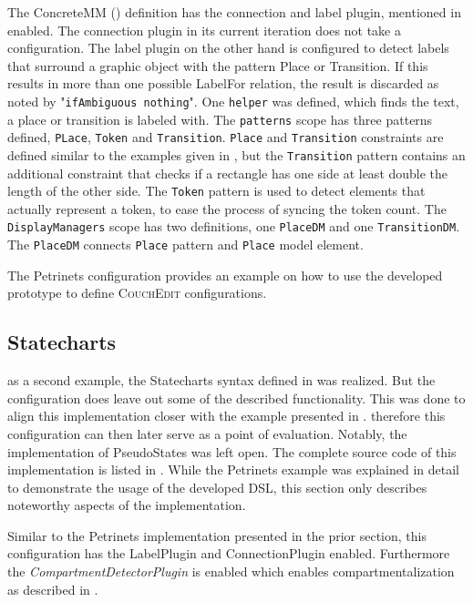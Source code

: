 The ConcreteMM () definition has the connection and label  plugin, mentioned in  enabled. The connection plugin in its current iteration does not take a configuration. The label plugin on the other hand is configured to detect labels that surround a graphic object with the pattern Place or Transition. If this results in more than one possible LabelFor relation, the result is discarded as noted by "\texttt{ifAmbiguous nothing}". One \texttt{helper} was defined, which finds the text, a place or transition is labeled with. The \texttt{patterns} scope has three patterns defined, \texttt{PLace}, \texttt{Token} and \texttt{Transition}. \texttt{Place} and \texttt{Transition} constraints are defined similar to the examples given in , but the \texttt{Transition} pattern contains an additional constraint that checks if a rectangle has one side at least double the length of the other side. The \texttt{Token} pattern is used to detect elements that actually represent a token, to ease the process of syncing the token count. The \texttt{DisplayManagers} scope has two definitions, one \texttt{PlaceDM} and one \texttt{TransitionDM}. The \texttt{PlaceDM} connects \texttt{Place} pattern and \texttt{Place} model element.

The Petrinets configuration provides an example on how to use the developed prototype to define \textsc{CouchEdit} configurations. 

\subsection{Statecharts}
\label{sec:state-impl}
as a second example, the Statecharts syntax defined in  was realized. But the configuration does leave out some of the described functionality. This was done to align this implementation closer with the example presented in \cite{nachreiner_couchedit_2020}. therefore this configuration can then later serve as a point of evaluation. Notably, the implementation of PseudoStates was left open. The complete source code of this implementation is listed in . While the Petrinets example was explained in detail to demonstrate the usage of the developed DSL, this section only describes noteworthy aspects of the implementation.

Similar to the Petrinets implementation presented in the prior section, this configuration has the LabelPlugin and ConnectionPlugin enabled. Furthermore the \emph{CompartmentDetectorPlugin} is enabled which enables compartmentalization as described in .

